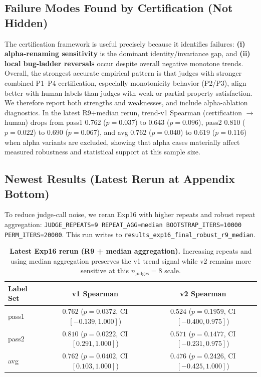\documentclass[numbers]{article}
\begin{document}
\subsection{Failure Modes Found by Certification (Not Hidden)}
The certification framework is useful precisely because it identifies failures:
\textbf{(i) alpha-renaming sensitivity} is the dominant identity/invariance gap,
and \textbf{(ii) local bug-ladder reversals} occur despite overall negative monotone trends.
Overall, the strongest accurate empirical pattern is that judges with stronger combined P1--P4 certification, especially monotonicity behavior (P2/P3), align better with human labels than judges with weak or partial property satisfaction.
We therefore report both strengths and weaknesses, and include alpha-ablation diagnostics.
In the latest R9+median rerun, trend-v1 Spearman (certification \(\rightarrow\) human) drops from
pass1 \(0.762\) (\(p=0.037\)) to \(0.643\) (\(p=0.096\)),
pass2 \(0.810\) (\(p=0.022\)) to \(0.690\) (\(p=0.067\)),
and avg \(0.762\) (\(p=0.040\)) to \(0.619\) (\(p=0.116\)) when alpha variants are excluded,
showing that alpha cases materially affect measured robustness and statistical support at this sample size.

\subsection{Newest Results (Latest Rerun at Appendix Bottom)}
To reduce judge-call noise, we reran Exp16 with higher repeats and robust repeat aggregation:
\texttt{JUDGE\_REPEATS=9 REPEAT\_AGG=median BOOTSTRAP\_ITERS=10000 PERM\_ITERS=20000}.
This run writes to \texttt{results\_exp16\_final\_robust\_r9\_median}.

\begin{table}[t]
  \centering
  \small
  \begin{tabular}{lcc}
    \toprule
    \textbf{Label Set} & \textbf{v1 Spearman}                             & \textbf{v2 Spearman}                             \\
    \midrule
    pass1              & \(0.762\) (\(p=0.0372\), CI \([-0.139, 1.000]\)) & \(0.524\) (\(p=0.1959\), CI \([-0.400, 0.975]\)) \\
    pass2              & \(0.810\) (\(p=0.0222\), CI \([0.291, 1.000]\))  & \(0.571\) (\(p=0.1477\), CI \([-0.231, 0.975]\)) \\
    avg                & \(0.762\) (\(p=0.0402\), CI \([0.103, 1.000]\))  & \(0.476\) (\(p=0.2426\), CI \([-0.425, 1.000]\)) \\
    \bottomrule
  \end{tabular}
  \caption{\textbf{Latest Exp16 rerun (R9 + median aggregation).}
    Increasing repeats and using median aggregation preserves the v1 trend signal while v2 remains more sensitive at this \(n_\text{judges}=8\) scale.}
  \label{tab:app-latest-r9-median}
\end{table}
\end{document}
